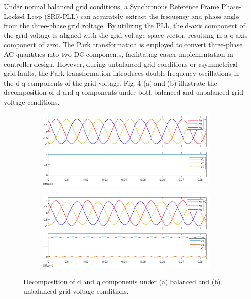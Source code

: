 \documentclass[conference]{IEEEtran}
\begin{document}
Under normal balanced grid conditions, a Synchronous Reference Frame Phase-Locked Loop (SRF-PLL) can accurately extract the frequency and phase angle from the three-phase grid voltage. By utilizing the PLL, the d-axis component of the grid voltage is aligned with the grid voltage space vector, resulting in a q-axis component of zero. The Park transformation is employed to convert three-phase AC quantities into two DC components, facilitating easier implementation in controller design. However, during unbalanced grid conditions or asymmetrical grid faults, the Park transformation introduces double-frequency oscillations in the d-q components of the grid voltage. Fig. 4 (a) and (b) illustrate the decomposition of d and q components under both balanced and unbalanced grid voltage conditions.

\begin{figure}[h!]
    \centering
    \begin{subfigure}[b]{0.45\textwidth}
        \includegraphics[width=\textwidth]{Figs/5_3_1/vabc_vdq_balance.png}
        \label{fig:a}
    \end{subfigure}
    \hfill
    \begin{subfigure}[b]{0.45\textwidth}
        \includegraphics[width=\textwidth]{Figs/5_3_1/vabc_vdq_unbalance.png}
        \label{fig:b}
    \end{subfigure}
    \caption{Decomposition of d and q components under (a) balanced and (b) unbalanced grid voltage conditions.}
    \label{fig:combined}
\end{figure}
\end{document}
